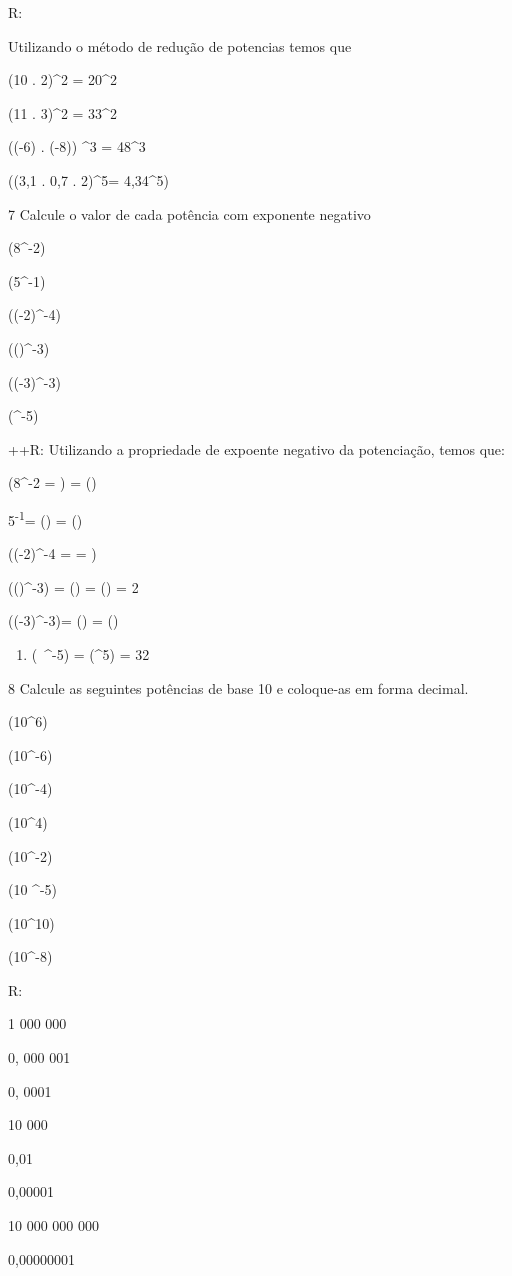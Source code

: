 R:

Utilizando o método de redução de potencias temos que
\item (10 . 2)^2 = 20^2
\item (11 . 3)^2 = 33^2
\item ((-6) . (-8)) ^3 = 48^3
\item ((3,1 . 0,7 . 2)^5= 4,34^5)

\num{7} Calcule o valor de cada potência com exponente negativo
\item (8^{-2})
\item (5^{-1})
\item ((-2)^{-4})
\item (()^{-3})
\item ((-3)^{-3})
\item (^{-5})

++R: Utilizando a propriedade de expoente negativo da potenciação, temos que:

\item (8^{-2} = ) = ()
\item 5\textsuperscript{-1}= () = ()
\item ((-2)^{-4} =  = )
\item (()^{-3}) = () = () = 2
\item ((-3)^{-3})= () = ()

\begin{enumerate}
\def\labelenumi{\alph{enumi})}
\setcounter{enumi}{5}
\tightlist
\item
  (\ ^{-5}) = (^5) = 32
\end{enumerate}

\num{8} Calcule as seguintes potências de base 10 e coloque-as em forma
decimal.
\item (10^6)
\item (10^-6)
\item (10^-4)
\item (10^4)
\item (10^-2)
\item (10 ^-5)
\item (10^10)
\item (10^-8)

R:
\item 1 000 000
\item 0, 000 001
\item 0, 0001
\item 10 000
\item 0,01
\item 0,00001
\item 10 000 000 000
\item 0,00000001

